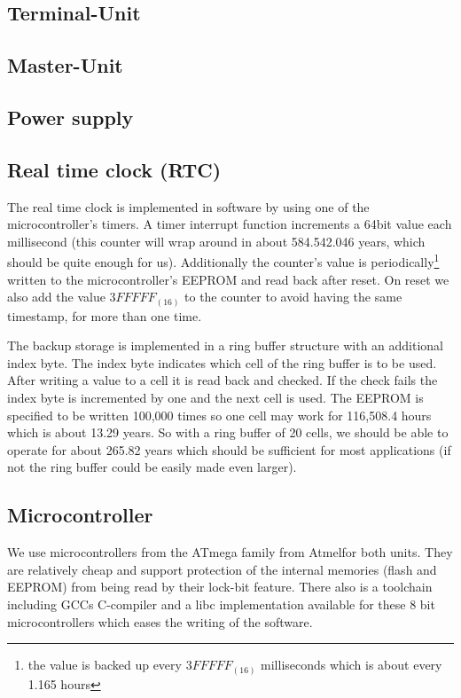
\subsection{Terminal-Unit}


\subsection{Master-Unit}


\subsection{Power supply}


\subsection{Real time clock (RTC)}
The real time clock is implemented in software by using one of the microcontroller's timers. A timer interrupt function increments a 64bit value each millisecond (this counter will wrap around in about 584.542.046 years, which should be quite enough for us). Additionally the counter's value is periodically\footnote{the value is backed up every $3FFFFF_{(16)}$ milliseconds which is about every 1.165 hours} written to the microcontroller's EEPROM and read back after reset. On reset we also add the value $3FFFFF_{(16)}$ to the counter to avoid having the same timestamp, for more than one time.

The backup storage is implemented in a ring buffer structure with an additional index byte. 
The index byte indicates which cell of the ring buffer is to be used. After writing a value to a cell it is read back and checked. If the check fails the index byte is incremented by one and the next cell is used. The EEPROM is specified to be written 100,000 times so one cell may work for 116,508.4 hours which is about 13.29 years. So with a ring buffer of 20 cells, we should be able to operate for about 265.82 years which should be sufficient for most applications (if not the ring buffer could be easily made even larger).


\subsection{Microcontroller}
We use microcontrollers from the ATmega family from Atmel\cite{Atmel}for both units. They are relatively cheap and support protection of the internal memories (flash and EEPROM) from being read by their lock-bit feature. There also is a toolchain including GCCs\cite{GCC} C-compiler and a libc implementation\cite{AVR-Libc} available for these 8 bit microcontrollers which eases the writing of the software.

